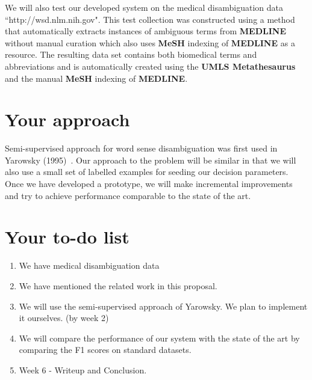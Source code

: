 \documentclass[11pt,letterpaper]{article}
\begin{document}
We will also test our developed system on the medical disambiguation data ``http://wsd.nlm.nih.gov". This test collection was constructed using a method that automatically extracts instances of ambiguous terms from \textbf{MEDLINE} without manual curation which also uses \textbf{MeSH} indexing of \textbf{MEDLINE} as a resource. The resulting data set contains both biomedical terms and abbreviations and is automatically created using the \textbf{UMLS Metathesaurus} and the manual \textbf{MeSH} indexing of \textbf{MEDLINE}. 

\section*{Your approach} 
Semi-supervised approach for word sense disambiguation was first used in Yarowsky (1995)~\cite{yarowsky1995unsupervised}. Our approach to the problem will be similar in that we will also use a small set of labelled examples for seeding our decision parameters. Once we have developed a prototype, we will make incremental improvements and try to achieve performance comparable to the state of the art.

\section*{Your to-do list}
\begin{enumerate}
\item We have medical disambiguation data
\item We have mentioned the related work in this proposal.
\item We will use the semi-supervised approach of Yarowsky. We plan to implement it ourselves. (by week 2)
\item We will compare the performance of our system with the state of the art by comparing the F1 scores on standard datasets.
\item Week 6 - Writeup and Conclusion.
\end{enumerate}



\end{document}
